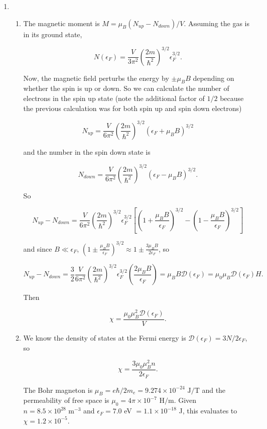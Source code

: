 \documentclass{article}
\begin{document}
\begin{enumerate}
\begin{enumerate}[(a)]
	\end{enumerate}

	\item

	\begin{enumerate}

		\item

		The magnetic moment is $M = \mu_B(N_{up} - N_{down})/V$. Assuming the gas is in its ground state,

		$$N(\epsilon_F) = \frac{V}{3\pi^2} \left( \frac{2m}{\hbar^2} \right)^{3/2} \epsilon_F^{3/2}.$$

		Now, the magnetic field perturbs the energy by $\pm \mu_B B$ depending on whether the spin is up or down. So we can calculate the number of electrons in the spin up state (note the additional factor of $1/2$ because the previous calculation was for both spin up and spin down electrons)

		$$N_{up} = \frac{V}{6\pi^2} \left( \frac{2m}{\hbar^2} \right)^{3/2} (\epsilon_F + \mu_B B)^{3/2}$$

		and the number in the spin down state is

		$$N_{down} = \frac{V}{6\pi^2} \left( \frac{2m}{\hbar^2} \right)^{3/2} (\epsilon_F - \mu_B B)^{3/2}.$$

		So 

		$$N_{up} - N_{down} = \frac{V}{6\pi^2} \left( \frac{2m}{\hbar^2} \right)^{3/2} \epsilon_F^{3/2} \left[ \left( 1 + \frac{\mu_B B}{\epsilon_F} \right)^{3/2} - \left( 1 - \frac{\mu_B B}{\epsilon_F} \right)^{3/2} \right]$$

		and since $B \ll \epsilon_F$, $\left( 1 \pm \frac{\mu_B B}{\epsilon_F} \right)^{3/2} \approx 1 \pm \frac{3\mu_B B}{2\epsilon_F}$, so

		$$N_{up} - N_{down} = \frac{3}{2} \frac{V}{6\pi^2} \left( \frac{2m}{\hbar^2} \right)^{3/2} \epsilon_F^{3/2} \left( \frac{2 \mu_B B}{\epsilon_F} \right) = \mu_B B \mathcal{D}(\epsilon_F) = \mu_0 \mu_B \mathcal{D}(\epsilon_F)H.$$

		Then

		$$\chi  = \frac{ \mu_0 \mu_B^2 \mathcal{D}(\epsilon_F)}{V}.$$ 

		\item

		We know the density of states at the Fermi energy is $\mathcal{D}(\epsilon_F) = 3N/2\epsilon_F$, so

		$$\chi  = \frac{3 \mu_0 \mu_B^2 n}{2\epsilon_F}.$$ 

		The Bohr magneton is $\mu_B = e\hbar/2m_e = 9.274 \times 10^{-24} \text{ J}/\text{T}$ and the permeability of free space is $\mu_0 = 4\pi \times 10^{-7} \text{ H}/\text{m}$. Given $n = 8.5 \times 10^{28} \text{ m}^{-3}$ and $\epsilon_F = 7.0$ eV $= 1.1 \times 10^{-18}$ J, this evaluates to $\chi = 1.2 \times 10^{-5}$.


\end{enumerate}
\end{enumerate}
\end{document}
